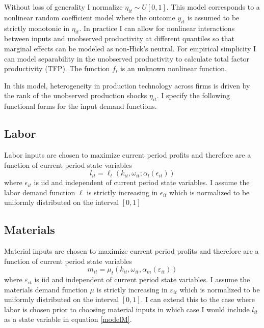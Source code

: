 \documentclass{article}
\begin{document}
Without loss of generality I normalize $\eta_{it}\sim U[0,1]$. This model corresponds to a nonlinear random coefficient model where the outcome $y_{it}$ is assumed to be strictly monotonic in $\eta_{it}$. In practice I can allow for nonlinear interactions between inputs and unobserved productivity at different quantiles so that marginal effects can be modeled as non-Hick's neutral. For empirical simplicity I can model separability in the unobserved productivity to calculate total factor productivity (TFP). The function $f_{t}$ is an unknown nonlinear function.

In this model, heterogeneity in production technology across firms is driven by the rank of the unobserved production shocks $\eta_{it}$. I specify the following functional forms for the input demand functions.

\subsection*{Labor} 
Labor inputs are chosen to maximize current period profits and therefore are a function of current period state variables
\begin{equation} \label{modelL}
l_{it}=\ell_{t}(k_{it}, \omega_{it}; \alpha_{l}(\epsilon_{it}))
\end{equation}
where $\epsilon_{it}$ is iid and independent of current period state variables. I assume the labor demand function $\ell$ is strictly increasing in $\epsilon_{it}$ which is normalized to be uniformly distributed on the interval $[0,1]$

\subsection*{Materials} 
Material inputs are chosen to maximize current period profits and therefore are a function of current period state variables
\begin{equation} \label{modelM}
m_{it}=\mu_{t}(k_{it}, \omega_{it}, \alpha_{m}(\varepsilon_{it}))
\end{equation}
where $\varepsilon_{it}$ is iid and independent of current period state variables. I assume the materials demand function $\mu$ is strictly increasing in $\varepsilon_{it}$ which is normalized to be uniformly distributed on the interval $[0,1]$. I can extend this to the case where labor is chosen prior to choosing material inputs in which case I would include $l_{it}$ as a state variable in equation \eqref{modelM}.
\end{document}

